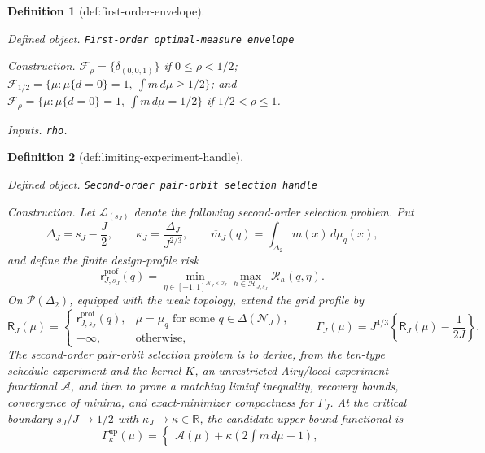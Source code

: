 \documentclass{article}
\newtheorem{definition}{Definition}
\begin{document}
\begin{definition}[def:first-order-envelope]\label{def:first-order-envelope}
\par\smallskip\noindent\emph{Defined object.} \texttt{First-\allowbreak{}order optimal-\allowbreak{}measure envelope}
\par\smallskip\noindent\emph{Construction.} \(\mathcal F_\rho=\{\delta_{(0,0,1)}\}\) if \(0\le\rho<1/2\); \(\mathcal F_{1/2}=\{\mu:\mu\{d=0\}=1,\ \int m\,d\mu\ge1/2\}\); and \(\mathcal F_\rho=\{\mu:\mu\{d=0\}=1,\ \int m\,d\mu=1/2\}\) if \(1/2<\rho\le1\).
\par\smallskip\noindent\emph{Inputs.} \texttt{rho}.
\end{definition}

\begin{definition}[def:limiting-experiment-handle]\label{def:limiting-experiment-handle}
\par\smallskip\noindent\emph{Defined object.} \texttt{Second-\allowbreak{}order pair-\allowbreak{}orbit selection handle}
\par\smallskip\noindent\emph{Construction.} Let \(\mathcal L_{(s_J)}\) denote the following second-order selection problem. Put
\[
 \Delta_J=s_J-\frac J2,
 \qquad
 \kappa_J=\frac{\Delta_J}{J^{2/3}},
 \qquad
 \overline m_J(q)=\int_{\Delta_2}m(x)\,d\mu_q(x),
\]
and define the finite design-profile risk
\[
 \mathsf r^{\mathrm{prof}}_{J,s_J}(q)
 =\min_{\eta\in[-1,1]^{\mathcal N_J\times\mathcal O_J}}
   \max_{h\in\mathcal H_{J,s_J}}\mathcal R_h(q,\eta).
\]
On \(\mathcal P(\Delta_2)\), equipped with the weak topology, extend the grid profile by
\[
 \mathsf R_J(\mu)=
 \begin{cases}
 \mathsf r^{\mathrm{prof}}_{J,s_J}(q),&\mu=\mu_q\text{ for some }q\in\Delta(\mathcal N_J),\\
 +\infty,&\text{otherwise},
 \end{cases}
 \qquad
 \Gamma_J(\mu)=J^{4/3}\left\{\mathsf R_J(\mu)-\frac1{2J}\right\}.
\]
The second-order pair-orbit selection problem is to derive, from the ten-type schedule experiment and the kernel \(K\), an unrestricted Airy/local-experiment functional \(\mathcal A\), and then to prove a matching liminf inequality, recovery bounds, convergence of minima, and exact-minimizer compactness for \(\Gamma_J\). At the critical boundary \(s_J/J\to1/2\) with \(\kappa_J\to\kappa\in\mathbb R\), the candidate upper-bound functional is
\[
 \Gamma^{\mathrm{up}}_\kappa(\mu)
 =
 \begin{cases}
 \mathcal A(\mu)+\kappa\left(2\displaystyle\int m\,d\mu-1\right),

\end{cases}\]
\end{definition}
\end{document}
